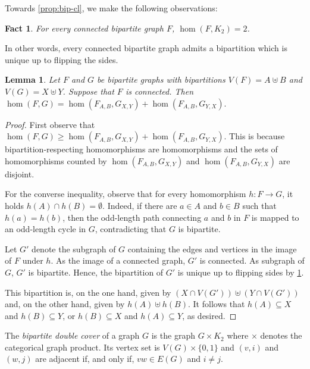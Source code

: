 \documentclass[11pt, DIV=15]{scrarticle}
\theoremstyle{definition}
\theoremstyle{plain}
\newtheorem{lemma}[definition]{Lemma}
\newtheorem{fact}[definition]{Fact}
\theoremstyle{remark}
\begin{document}
	
	Towards \cref{prop:bip-cl}, we make the following observations:
	\begin{fact}\label{lem:bipartite3}
		For every connected bipartite graph $F$,
		$\hom(F, K_2) = 2$.
	\end{fact}
	In other words, every connected bipartite graph admits a bipartition which is unique up to flipping the sides. 
	
	\begin{lemma}\label{lem:bipartite1}
		Let $F$ and $G$ be bipartite graphs
		with bipartitions $V(F) = A \uplus B$ and $V(G) = X \uplus Y$. Suppose that $F$ is connected.
		Then
		$
		\hom(F, G) = \hom(F_{A, B}, G_{X, Y}) + \hom(F_{A, B}, G_{Y, X}).
		$ 
	\end{lemma}
	\begin{proof}
		First observe that $
		\hom(F, G) \geq \hom(F_{A, B}, G_{X, Y}) + \hom(F_{A, B}, G_{Y, X}).
		$ 
		This is because bipartition-respecting homomorphisms are homomorphisms and the sets of homomorphisms counted by $\hom(F_{A, B}, G_{X, Y}) $ and $\hom(F_{A, B}, G_{Y, X})$ are disjoint.
		
		For the converse inequality, observe that for every homomorphism $h \colon F \to G$, it holds $h(A) \cap h(B) = \emptyset$.
		Indeed, if there are $a \in A$ and $b \in B$ such that $h(a) = h(b)$, then the odd-length path connecting $a$ and $b$ in $F$ is mapped to an odd-length cycle in $G$,
		contradicting that $G$ is bipartite.
		
		Let $G'$ denote the subgraph of $G$ containing the edges and vertices in the image of $F$ under $h$.
		As the image of a connected graph,  $G'$ is connected.
		As subgraph of $G$, $G'$ is bipartite.
		Hence, the bipartition of $G'$ is unique up to flipping sides by \cref{lem:bipartite3}.
		
		This bipartition is, on the one hand, given by $(X \cap V(G')) \uplus (Y \cap V(G'))$ and, on the other hand, 
		given by $h(A) \uplus h(B)$.
		It follows that $h(A) \subseteq X$ and $h(B) \subseteq Y$, or $h(B) \subseteq X$ and $h(A) \subseteq Y$, as desired.
	\end{proof}
	
	
	
	The \emph{bipartite double cover} of a graph $G$ is the graph $G \times K_2$ where  $\times$ denotes the categorical graph product.
	Its vertex set is $V(G) \times \{0,1\}$ and $(v, i)$ and $(w,j)$ are adjacent if, and only if, $vw \in E(G)$ and $i \neq j$.
	
\end{document}
